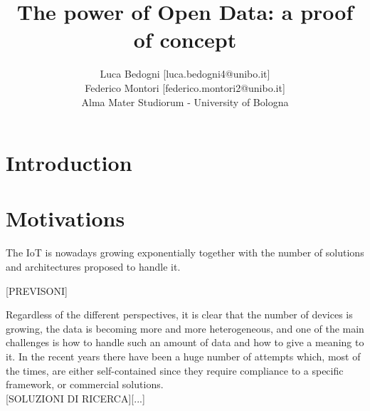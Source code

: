\documentclass[a4paper,10pt]{article}
\title{The power of Open Data: a proof of concept}
\author{Luca Bedogni [luca.bedogni4@unibo.it]\\Federico Montori [federico.montori2@unibo.it]\\Alma Mater Studiorum - University of Bologna}
\begin{document}
\maketitle
% 
% 

\section{Introduction}

\section{Motivations}

The IoT is nowadays growing exponentially together with the number of solutions and architectures proposed to handle it.

[PREVISONI]
 
Regardless of the different perspectives, it is clear that the number of devices is growing, the data is becoming more and more heterogeneous, and one of the main challenges is how to handle such an amount of data and how to give a meaning to it.
In the recent years there have been a huge number of attempts which, most of the times, are either self-contained since they require compliance to a specific framework, or commercial solutions.
\\

[SOLUZIONI DI RICERCA][...]
\\
\end{document}
